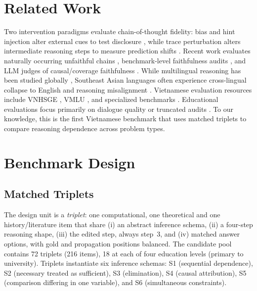 \section{Related Work}
\label{sec:related}

Two intervention paradigms evaluate chain-of-thought fidelity: bias and hint injection alter external cues to test disclosure \citep{turpin2023}, while trace perturbation alters intermediate reasoning steps to measure prediction shifts \citep{lanham2023,chen2025reasoning}. Recent work evaluates naturally occurring unfaithful chains \citep{arcuschin2026}, benchmark-level faithfulness audits \citep{shen2026faithcot}, and LLM judges of causal/coverage faithfulness \citep{mittal2026c2}. While multilingual reasoning has been studied globally \citep{zhao2026}, Southeast Asian languages often experience cross-lingual collapse to English \citep{oscd2026} and reasoning misalignment \citep{ovalle2025beg}. Vietnamese evaluation resources include VNHSGE \citep{vnhsge2023}, VMLU \citep{bui2025vmlu}, and specialized benchmarks \citep{trung2026bridging,dong2025vlegal}. Educational evaluations focus primarily on dialogue quality \citep{kochmar2025findings,bhalerao2026grade} or truncated audits \citep{trace2026}. To our knowledge, this is the first Vietnamese benchmark that uses matched triplets to compare reasoning dependence across problem types.

\section{Benchmark Design}
\label{sec:design}

\subsection{Matched Triplets}

The design unit is a \emph{triplet}: one computational, one theoretical and one history/literature item that share (i) an abstract inference schema, (ii) a four-step reasoning shape, (iii) the edited step, always step~3, and (iv) matched answer options, with gold and propagation positions balanced. The candidate pool contains 72 triplets (216 items), 18 at each of four education levels (primary to university). Triplets instantiate six inference schemas: S1 (sequential dependence), S2 (necessary treated as sufficient), S3 (elimination), S4 (causal attribution), S5 (comparison differing in one variable), and S6 (simultaneous constraints).

